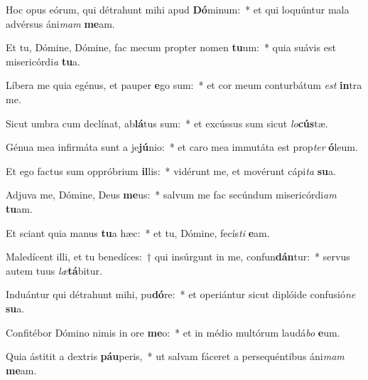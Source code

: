 \item Hoc opus eórum, qui détrahunt mihi apud \textbf{Dó}minum:~* et qui loquúntur mala advérsus áni\textit{mam} \textbf{me}am.
\item Et tu, Dómine, Dómine, fac mecum propter nomen \textbf{tu}um:~* quia suávis est misericórdi\textit{a} \textbf{tu}a.
\item Líbera me quia egénus, et pauper \textbf{e}go sum:~* et cor meum conturbátum \textit{est} \textbf{in}tra me.
\item Sicut umbra cum declínat, ab\textbf{lá}tus sum:~* et excússus sum sicut \textit{lo}\textbf{cús}tæ.
\item Génua mea infirmáta sunt a je\textbf{jú}nio:~* et caro mea immutáta est prop\textit{ter} \textbf{ó}leum.
\item Et ego factus sum oppróbrium \textbf{il}lis:~* vidérunt me, et movérunt cápi\textit{ta} \textbf{su}a.
\item Adjuva me, Dómine, Deus \textbf{me}us:~* salvum me fac secúndum misericórdi\textit{am} \textbf{tu}am.
\item Et sciant quia manus \textbf{tu}a hæc:~* et tu, Dómine, fecís\textit{ti} \textbf{e}am.
\item Maledícent illi, et tu benedíces:~† qui insúrgunt in me, confun\textbf{dán}tur:~* servus autem tuus \textit{læ}\textbf{tá}bitur.
\item Induántur qui détrahunt mihi, pu\textbf{dó}re:~* et operiántur sicut diplóide confusió\textit{ne} \textbf{su}a.
\item Confitébor Dómino nimis in ore \textbf{me}o:~* et in médio multórum laudá\textit{bo} \textbf{e}um.
\item Quia ástitit a dextris \textbf{páu}peris,~* ut salvam fáceret a persequéntibus áni\textit{mam} \textbf{me}am.
